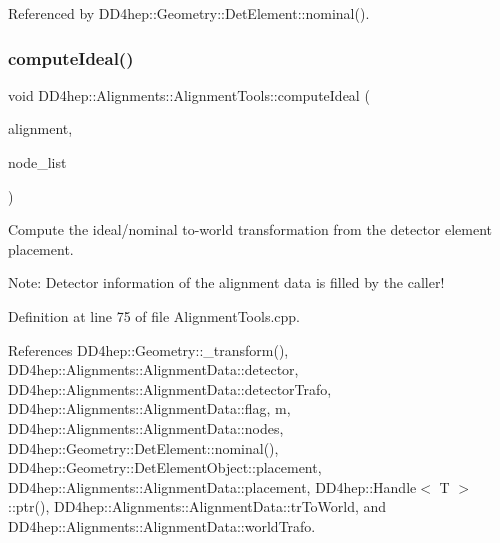 Referenced by D\+D4hep\+::\+Geometry\+::\+Det\+Element\+::nominal().

\hypertarget{namespace_d_d4hep_1_1_alignments_1_1_alignment_tools_a531f04a21638b77afa2f81378f5837cd}{}\label{namespace_d_d4hep_1_1_alignments_1_1_alignment_tools_a531f04a21638b77afa2f81378f5837cd} 
\subsubsection{\texorpdfstring{compute\+Ideal()}{computeIdeal()}\hspace{0.1cm}{\footnotesize\ttfamily [2/2]}}
{\footnotesize\ttfamily void D\+D4hep\+::\+Alignments\+::\+Alignment\+Tools\+::compute\+Ideal (\begin{DoxyParamCaption}\item[{\hyperlink{class_d_d4hep_1_1_alignments_1_1_alignment}{Alignment}}]{alignment,  }\item[{const \hyperlink{class_d_d4hep_1_1_alignments_1_1_alignment_a83282984664b4e1117f46d8a8bc40cb7}{Alignment\+::\+Node\+List} \&}]{node\+\_\+list }\end{DoxyParamCaption})}



Compute the ideal/nominal to-\/world transformation from the detector element placement. 

Note\+: Detector information of the alignment data is filled by the caller! 

Definition at line 75 of file Alignment\+Tools.\+cpp.



References D\+D4hep\+::\+Geometry\+::\+\_\+transform(), D\+D4hep\+::\+Alignments\+::\+Alignment\+Data\+::detector, D\+D4hep\+::\+Alignments\+::\+Alignment\+Data\+::detector\+Trafo, D\+D4hep\+::\+Alignments\+::\+Alignment\+Data\+::flag, m, D\+D4hep\+::\+Alignments\+::\+Alignment\+Data\+::nodes, D\+D4hep\+::\+Geometry\+::\+Det\+Element\+::nominal(), D\+D4hep\+::\+Geometry\+::\+Det\+Element\+Object\+::placement, D\+D4hep\+::\+Alignments\+::\+Alignment\+Data\+::placement, D\+D4hep\+::\+Handle$<$ T $>$\+::ptr(), D\+D4hep\+::\+Alignments\+::\+Alignment\+Data\+::tr\+To\+World, and D\+D4hep\+::\+Alignments\+::\+Alignment\+Data\+::world\+Trafo.

\hypertarget{namespace_d_d4hep_1_1_alignments_1_1_alignment_tools_af9a9447a5a7239e67ab41f0157931822}{}\label{namespace_d_d4hep_1_1_alignments_1_1_alignment_tools_af9a9447a5a7239e67ab41f0157931822} 
